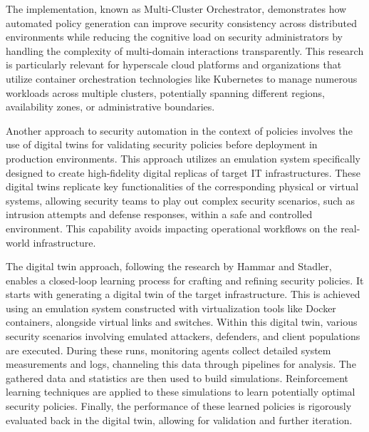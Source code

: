 The implementation, known as Multi-Cluster Orchestrator, demonstrates how automated policy generation can improve security consistency across distributed environments while reducing the cognitive load on security administrators by handling the complexity of multi-domain interactions transparently\cite{bringhenti_security_2023}. This research is particularly relevant for hyperscale cloud platforms and organizations that utilize container orchestration technologies like Kubernetes to manage numerous workloads across multiple clusters, potentially spanning different regions, availability zones, or administrative boundaries\cite{bringhenti_security_2023}.

Another approach to security automation in the context of policies involves the use of digital twins for validating security policies before deployment in production environments\cite{hammar_digital_2023}. This approach utilizes an emulation system specifically designed to create high-fidelity digital replicas of target IT infrastructures\cite{hammar_digital_2023}. These digital twins replicate key functionalities of the corresponding physical or virtual systems, allowing security teams to play out complex security scenarios, such as intrusion attempts and defense responses, within a safe and controlled environment\cite{hammar_digital_2023}. This capability avoids impacting operational workflows on the real-world infrastructure\cite{hammar_digital_2023}.

The digital twin approach, following the research by Hammar and Stadler, enables a closed-loop learning process for crafting and refining security policies\cite{hammar_digital_2023}. It starts with generating a digital twin of the target infrastructure. This is achieved using an emulation system constructed with virtualization tools like Docker containers, alongside virtual links and switches\cite{hammar_digital_2023}. Within this digital twin, various security scenarios involving emulated attackers, defenders, and client populations are executed\cite{hammar_digital_2023}. During these runs, monitoring agents collect detailed system measurements and logs, channeling this data through pipelines for analysis\cite{hammar_digital_2023}. The gathered data and statistics are then used to build simulations\cite{hammar_digital_2023}. Reinforcement learning techniques are applied to these simulations to learn potentially optimal security policies\cite{hammar_digital_2023}. Finally, the performance of these learned policies is rigorously evaluated back in the digital twin, allowing for validation and further iteration\cite{hammar_digital_2023}.

